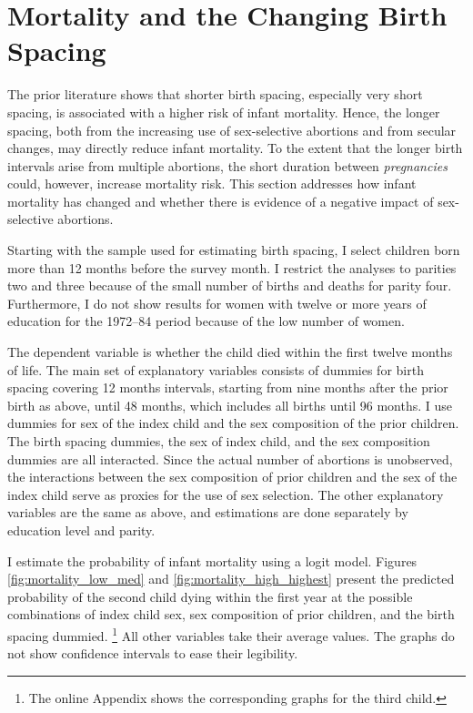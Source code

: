 \documentclass[12pt,letterpaper]{article}
\begin{document}
\section{Mortality and the Changing Birth Spacing\label{sec:mortality}}

The prior literature shows that shorter birth spacing, especially very short spacing,
is associated with a higher risk of infant mortality.
Hence, the longer spacing, both from the increasing use of sex-selective abortions and
from secular changes, may directly reduce infant mortality.
To the extent that the longer birth intervals arise from multiple abortions,
the short duration between \emph{pregnancies} could, however, increase mortality risk.
This section addresses how infant mortality has changed and whether there is evidence
of a negative impact of sex-selective abortions.

Starting with the sample used for estimating birth spacing, I select children born 
more than 12 months before the survey month.
I restrict the analyses to parities two and three because of the small number
of births and deaths for parity four.
Furthermore, I do not show results for women with twelve or more years of
education for the 1972--84 period because of the low number of women.

The dependent variable is whether the child died within the first twelve
months of life.
The main set of explanatory variables consists of dummies for birth spacing
covering 12 months intervals, starting from nine months after the prior birth 
as above, until 48 months, which includes all births until 96 months.
I use dummies for sex of the index child and the sex composition 
of the prior children.
The birth spacing dummies, the sex of index child, and the sex composition dummies
are all interacted.
Since the actual number of abortions is unobserved, the interactions between
the sex composition of prior children and the sex of the index child serve
as proxies for the use of sex selection.
The other explanatory variables are the same as above, and estimations
are done separately by education level and parity.

I estimate the probability of infant mortality using a logit model.
Figures \ref{fig:mortality_low_med} and \ref{fig:mortality_high_highest} present 
the predicted probability of the second child dying within the first year at the 
possible combinations of index child sex, sex composition of prior children, and 
the birth spacing dummied.%
\footnote{
The online Appendix shows the corresponding graphs for the third child.
}
All other variables take their average values.
The graphs do not show confidence intervals to ease their legibility.
\end{document}
